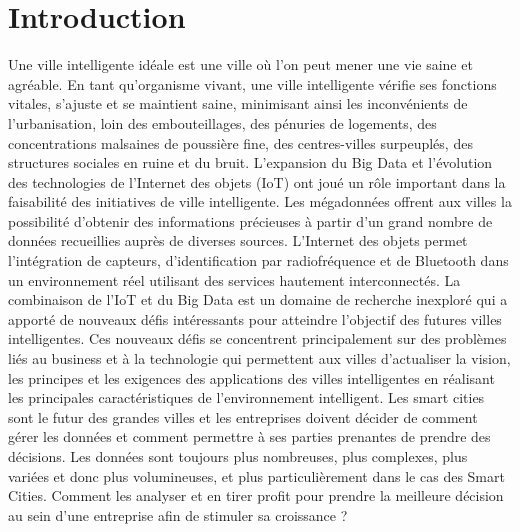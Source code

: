 \documentclass[french, a4paper, 12pt]{report}
\begin{document}
\chapter*{Introduction}
Une ville intelligente idéale est une ville où l’on peut mener une vie saine et agréable. En tant qu’organisme vivant, une ville intelligente vérifie ses fonctions vitales, s’ajuste et se maintient saine, minimisant ainsi les inconvénients de l’urbanisation, loin des embouteillages, des pénuries de logements, des concentrations malsaines de poussière fine, des centres-villes surpeuplés, des structures sociales en ruine et du bruit.
L'expansion du Big Data et l'évolution des technologies de l'Internet des objets (IoT) ont joué un rôle important dans la faisabilité des initiatives de ville intelligente. Les mégadonnées offrent aux villes la possibilité d’obtenir des informations précieuses à partir d’un grand nombre de données recueillies auprès de diverses sources. L’Internet des objets permet l’intégration de capteurs, d’identification par radiofréquence et de Bluetooth dans un environnement réel utilisant des services hautement interconnectés. La combinaison de l'IoT  et du Big Data est un domaine de recherche inexploré qui a apporté de nouveaux défis intéressants pour atteindre l'objectif des futures villes intelligentes. Ces nouveaux défis se concentrent principalement sur des problèmes liés au business et à la technologie qui permettent aux villes d’actualiser la vision, les principes et les exigences des applications des villes intelligentes en réalisant les principales caractéristiques de l’environnement intelligent. Les smart cities sont le futur des grandes villes et les entreprises doivent décider de comment gérer les données et comment permettre à ses parties prenantes de prendre des décisions. Les données sont toujours plus nombreuses, plus complexes, plus variées et donc plus volumineuses, et plus particulièrement dans le cas des Smart Cities. Comment les analyser et en tirer profit pour prendre la meilleure décision au sein d’une entreprise afin de stimuler sa croissance ? \\
\end{document}
